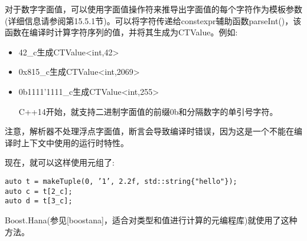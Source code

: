 对于数字字面值，可以使用字面值操作符来推导出字面值的每个字符作为模板参数(详细信息请参阅第15.5.1节)。可以将字符传递给constexpr辅助函数parseInt()，该函数在编译时计算字符序列的值，并将其生成为CTValue。例如:

\begin{itemize}
\item 
42\_c生成CTValue<int,42>

\item 
0x815\_c生成CTValue<int,2069>

\item 
0b1111'1111\_c生成CTValue<int,255>

\begin{tcolorbox}[colback=webgreen!5!white,colframe=webgreen!75!black]
\hspace*{0.75cm}C++14开始，就支持二进制字面值的前缀0b和分隔数字的单引号字符。
\end{tcolorbox}
\end{itemize}

注意，解析器不处理浮点字面值，断言会导致编译时错误，因为这是一个不能在编译时上下文中使用的运行时特性。

现在，就可以这样使用元组了:

\begin{lstlisting}[style=styleCXX]
auto t = makeTuple(0, ’1’, 2.2f, std::string{"hello"});
auto c = t[2_c];
auto d = t[3_c];
\end{lstlisting}

Boost.Hana(参见[boostana]，适合对类型和值进行计算的元编程库)就使用了这种方法。



























